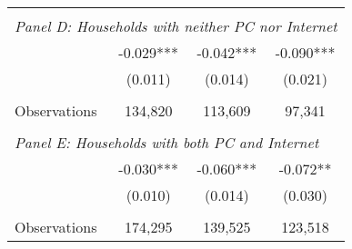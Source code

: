 {\begin{tabular}{lccc}
&  &  &   \\
\multicolumn{4}{l}{\textit{Panel D: Households with neither PC nor Internet}} \\
\hspace{3mm}        &      -0.029***&      -0.042***&      -0.090***\\
                    &     (0.011)   &     (0.014)   &     (0.021)   \\
                    &               &               &               \\
\hspace{3mm}Observations&     134,820   &     113,609   &      97,341   \\
 
&  &  &   \\
\multicolumn{4}{l}{\textit{Panel E: Households with both PC and Internet}} \\
\hspace{3mm}        &      -0.030***&      -0.060***&      -0.072** \\
                    &     (0.010)   &     (0.014)   &     (0.030)   \\
                    &               &               &               \\
\hspace{3mm}Observations&     174,295   &     139,525   &     123,518   \\
 

\bottomrule
\end{tabular}
}
